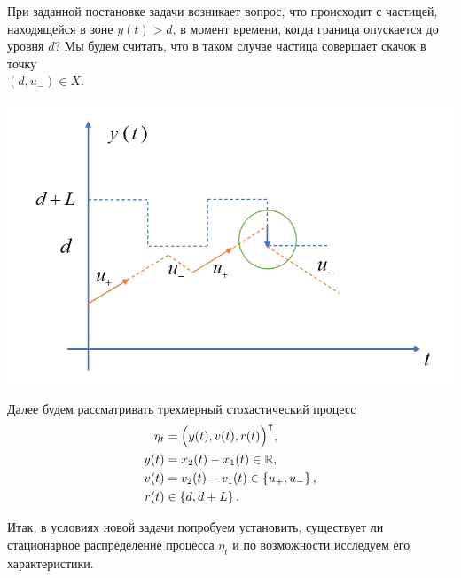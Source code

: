 \documentclass[12pt,a4paper]{article}
\begin{document}
При заданной постановке задачи возникает вопрос, что происходит с частицей, находящейся в зоне $y(t) > d$, в момент времени, когда граница опускается до уровня $d$? Мы будем считать, что в таком случае частица совершает скачок в точку \\$(d, u_-) \in X$.
\begin{center}
    \includegraphics[scale=0.4]{new_model.png}\\
\end{center}

Далее будем рассматривать трехмерный стохастический процесс
\begin{equation*}
\begin{aligned}
\eta_t &= \Bigl( y(t), v(t), r(t)\Bigr)^\intercal, \\
y(t) &= x_2(t) - x_1(t) \in \mathbb{R}, \\
v(t) &= v_2(t) - v_1(t) \in \left\{ u_+, u_- \right\}, \\
r(t) &\in \left\{d, d + L\right\}.
\end{aligned}
\end{equation*}

Итак, в условиях новой задачи попробуем установить, существует ли стационарное распределение процесса $\eta_t$ и по возможности исследуем его характеристики.
\end{document}
